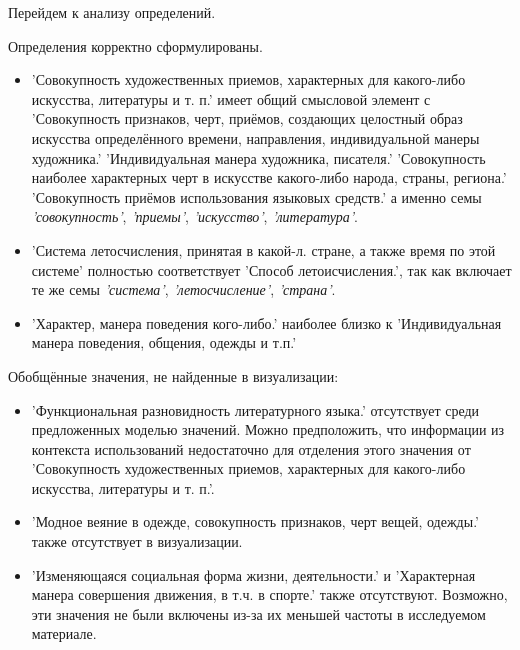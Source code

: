 Перейдем к анализу определений.

Определения корректно сформулированы.

\begin{itemize}
    \item ’Совокупность художественных приемов, характерных для какого-либо искусства, литературы и т. п.’ имеет общий смысловой элемент с
’Совокупность признаков, черт, приёмов, создающих целостный образ искусства определённого времени, направления, индивидуальной манеры художника.’
’Индивидуальная манера художника, писателя.’
’Совокупность наиболее характерных черт в искусстве какого-либо народа, страны, региона.’
’Совокупность приёмов использования языковых средств.’
а именно семы \textit{’совокупность’}, \textit{’приемы’}, \textit{’искусство’}, \textit{’литература’}.

    \item ’Система летосчисления, принятая в какой-л. стране, а также время по этой системе’ полностью соответствует
’Способ летоисчисления.’, так как включает те же семы \textit{’система’}, \textit{’летосчисление’}, \textit{’страна’}.
\end{itemize}

\begin{itemize}
    \item ’Характер, манера поведения кого-либо.’ наиболее близко к
’Индивидуальная манера поведения, общения, одежды и т.п.’
\end{itemize}

Обобщённые значения, не найденные в визуализации:
\begin{itemize}
    \item ’Функциональная разновидность литературного языка.’ отсутствует среди предложенных моделью значений.
Можно предположить, что информации из контекста использований недостаточно для отделения этого значения от ’Совокупность художественных приемов, характерных для какого-либо искусства, литературы и т. п.’.

    \item ’Модное веяние в одежде, совокупность признаков, черт вещей, одежды.’ также отсутствует в визуализации.

    \item ’Изменяющаяся социальная форма жизни, деятельности.’ и ’Характерная манера совершения движения, в т.ч. в спорте.’ также отсутствуют.
Возможно, эти значения не были включены из-за их меньшей частоты в исследуемом материале.
\end{itemize}

